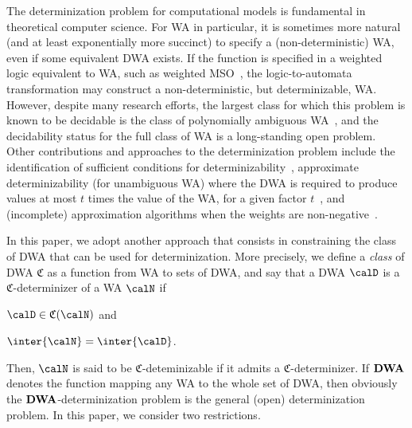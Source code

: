 \documentclass[a4paper]{article}
\begin{document}
The determinization problem for computational models is
fundamental in theoretical computer science. For WA in particular, it
is sometimes more natural (and at least exponentially more succinct)
to specify a (non-deterministic) WA, even if some equivalent DWA
exists. If the function is specified in a weighted logic equivalent to
WA, such as weighted MSO~\cite{journals/tcs/DrosteG07}, the
logic-to-automata transformation may construct a non-deterministic,
but determinizable, WA. However, despite many research efforts, the largest class
for which this problem is known to be decidable is the class of
polynomially ambiguous WA~\cite{kirsten_et_al:LIPIcs:2009:1850}, and
the decidability status for the full class of WA is a long-standing
open problem. Other contributions and approaches to the determinization problem
include the identification of sufficient conditions for
determinizability~\cite{Mohri_FiniteState_CoLing}, approximate determinizability
(for unambiguous WA) where the DWA is required to produce values %
at most $t$ times the value of the WA, for a given factor
$t$~\cite{journals/tcs/AminofKL13}, and (incomplete) approximation algorithms
when the weights are non-negative~\cite{journals/mst/ColcombetD16}.

 In this paper, we adopt
another approach that consists in constraining the class of DWA that can be
used for determinization. More precisely, we define a \emph{class} of
DWA $\mathfrak{C}$ as a function from WA to sets of DWA, and
say that a DWA $\calD$ is a $\mathfrak{C}$-determinizer of a WA $\calN$ if
\begin{inparaenum}[$(i)$]
\item $\calD \in \mathfrak{C}(\calN)$ and
\item $\inter{\calN} =
\inter{\calD}$.
\end{inparaenum}
Then, $\calN$ is said to be $\mathfrak{C}$-deteminizable if it admits a
${\mathfrak{C}}$-determinizer. If ${\bf DWA}$ denotes the function mapping any
WA to the whole set of DWA, then obviously the ${\bf DWA}$-determinization
problem is the general (open) determinization problem. In this paper, we consider
two restrictions. 
\end{document}
